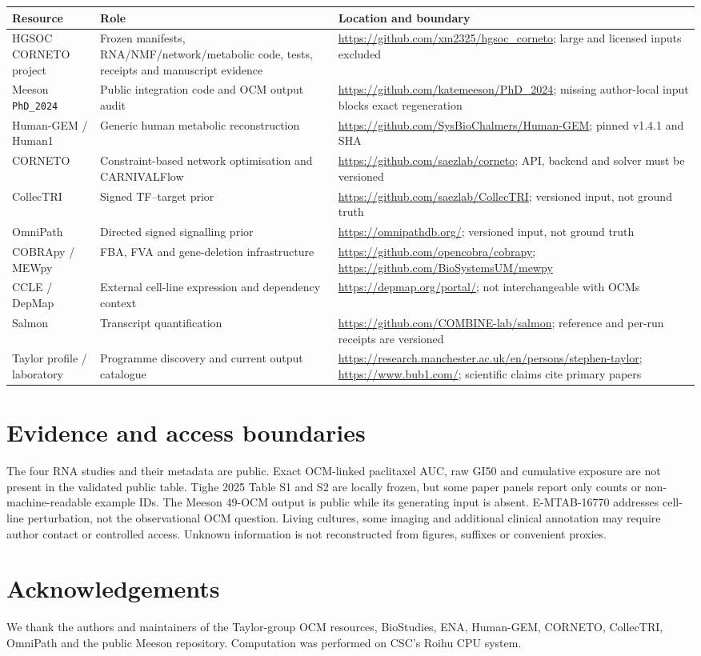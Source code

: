 \documentclass[10pt]{article}
\begin{document}
\begin{longtable}{p{3.4cm}p{5.1cm}p{5.4cm}}
\toprule
Resource & Role & Location and boundary \\
\midrule
HGSOC CORNETO project & Frozen manifests, RNA/NMF/network/metabolic code, tests, receipts and manuscript evidence & \url{https://github.com/xm2325/hgsoc_corneto}; large and licensed inputs excluded \\
Meeson \texttt{PhD\_2024} & Public integration code and OCM output audit & \url{https://github.com/katemeeson/PhD_2024}; missing author-local input blocks exact regeneration \\
Human-GEM / Human1 & Generic human metabolic reconstruction & \url{https://github.com/SysBioChalmers/Human-GEM}; pinned v1.4.1 and SHA \\
CORNETO & Constraint-based network optimisation and CARNIVALFlow & \url{https://github.com/saezlab/corneto}; API, backend and solver must be versioned \\
CollecTRI & Signed TF--target prior & \url{https://github.com/saezlab/CollecTRI}; versioned input, not ground truth \\
OmniPath & Directed signed signalling prior & \url{https://omnipathdb.org/}; versioned input, not ground truth \\
COBRApy / MEWpy & FBA, FVA and gene-deletion infrastructure & \url{https://github.com/opencobra/cobrapy}; \url{https://github.com/BioSystemsUM/mewpy} \\
CCLE / DepMap & External cell-line expression and dependency context & \url{https://depmap.org/portal/}; not interchangeable with OCMs \\
Salmon & Transcript quantification & \url{https://github.com/COMBINE-lab/salmon}; reference and per-run receipts are versioned \\
Taylor profile / laboratory & Programme discovery and current output catalogue & \url{https://research.manchester.ac.uk/en/persons/stephen-taylor}; \url{https://www.bub1.com/}; scientific claims cite primary papers \\
\bottomrule
\end{longtable}

\section{Evidence and access boundaries}

The four RNA studies and their metadata are public.  Exact OCM-linked
paclitaxel AUC, raw GI50 and cumulative exposure are not present in the
validated public table.  Tighe 2025 Table S1 and S2 are locally frozen, but
some paper panels report only counts or non-machine-readable example IDs.
The Meeson 49-OCM output is public while its generating input is absent.
E-MTAB-16770 addresses cell-line perturbation, not the observational OCM
question.  Living cultures, some imaging and additional clinical annotation
may require author contact or controlled access.  Unknown information is not
reconstructed from figures, suffixes or convenient proxies.

\section*{Acknowledgements}

We thank the authors and maintainers of the Taylor-group OCM resources,
BioStudies, ENA, Human-GEM, CORNETO, CollecTRI, OmniPath and the public Meeson
repository.  Computation was performed on CSC's Roihu CPU system.


\end{document}
